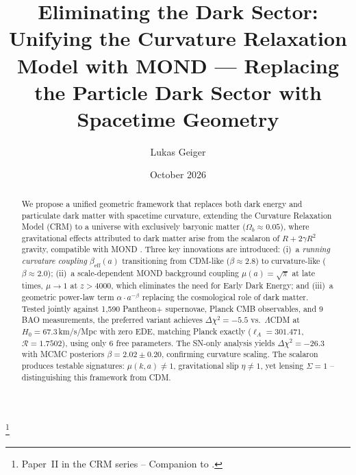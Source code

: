 \documentclass[aps,prd,twocolumn,superscriptaddress,nofootinbib,floatfix]{revtex4-2}
\begin{document}

\title{Eliminating the Dark Sector: Unifying the Curvature Relaxation Model with MOND \texorpdfstring{---}{--} Replacing the Particle Dark Sector with Spacetime Geometry}

\author{Lukas Geiger}

\date{October 2026}

\begin{abstract}
We propose a unified geometric framework that replaces both dark energy and particulate dark matter with spacetime curvature, extending the Curvature Relaxation Model (CRM) \cite{Geiger2026} to a universe with exclusively baryonic matter ($\Omega_b \approx 0.05$), where gravitational effects attributed to dark matter arise from the scalaron of $R + 2\gamma R^2$ gravity, compatible with MOND \cite{Milgrom1983}. Three key innovations are introduced: (i)~a \textit{running curvature coupling} $\beta_{\mathrm{eff}}(a)$ transitioning from CDM-like ($\beta \approx 2.8$) to curvature-like ($\beta \approx 2.0$); (ii)~a scale-dependent MOND background coupling $\mu(a) = \sqrt{\pi}$ at late times, $\mu \to 1$ at $z > 4000$, which eliminates the need for Early Dark Energy; and (iii)~a geometric power-law term $\alpha \cdot a^{-\beta}$ replacing the cosmological role of dark matter. Tested jointly against 1,590 Pantheon+ supernovae, Planck CMB observables, and 9 BAO measurements, the preferred variant achieves $\Delta\chi^2 = -5.5$ vs.\ $\Lambda$CDM at $H_0 = 67.3$\,km/s/Mpc with zero EDE, matching Planck exactly ($\ell_A = 301.471$, $\mathcal{R} = 1.7502$), using only 6 free parameters. The SN-only analysis yields $\Delta\chi^2 = -26.3$ with MCMC posteriors $\beta = 2.02 \pm 0.20$, confirming curvature scaling. The scalaron produces testable signatures: $\mu(k,a) \neq 1$, gravitational slip $\eta \neq 1$, yet lensing $\Sigma = 1$ -- distinguishing this framework from CDM.
\end{abstract}


\thanks{Paper~II in the CRM series -- Companion to \cite{Geiger2026}.}

\maketitle
\end{document}
